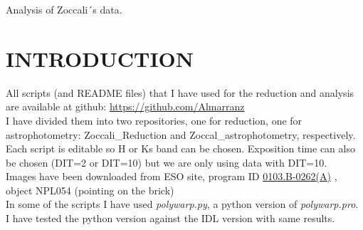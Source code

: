 \documentclass[4paper,11pt]{report}
\begin{document}
\begin{Huge}
	\begin{center}
	Analysis of Zoccali´s data.
	\end{center}
\end{Huge}

\section*{INTRODUCTION}
All scripts (and README files) that I have used for the reduction and analysis are available at github: \href{https://github.com/Almarranz}{https://github.com/Almarranz}\\
I have divided them into two repositories, one for reduction, one for astrophotometry: Zoccali\_Reduction and Zoccal\_astrophotometry, respectively.
Each script is editable so H or Ks band can be chosen. Exposition time can also be chosen (DIT=2 or DIT=10) but we are only using data with DIT=10.\\

Images have been downloaded from ESO site, program ID \href{http://archive.eso.org/wdb/wdb/eso/sched_rep_arc/query?progid=0103.B-0262(A)}{0103.B-0262(A)} , object NPL054 (pointing on the brick)\\

In some of the scripts I have used \textit{polywarp.py}, a python version of \textit{polywarp.pro}. I have tested the python version against the IDL version with same results.
\end{document}
